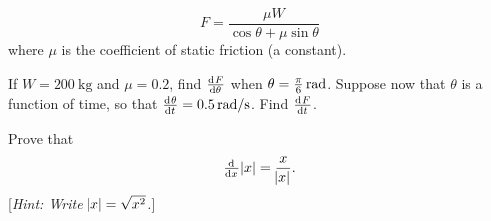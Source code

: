 \begin{questions}
\begin{displaymath}
              F = \frac{\mu W}{\cos \theta + \mu \sin \theta}
            \end{displaymath}
            where $ \mu $ is the coefficient of static friction (a constant).
    \begin{parts}
      \parA If $ W = \SI{200}{\kilo\gram} $ and $ \mu = 0.2 $, find $ \od{F}{\theta} $ when $ \theta = \frac{\pi}{6}\thinspace\si{\radian} $.
      \parM Suppose now that $ \theta $ is a function of time, so that $ \od{\theta}{t} = \SI{0.5}{\radian / \second} $. Find $ \od{F}{t} $.
    \end{parts}
  \questioE Prove that
            \begin{displaymath}
              \od{}{x} \abs{x} = \frac{x}{\abs{x}}.
            \end{displaymath}
            [\textit{Hint: Write $ \abs{x} = \sqrt{x^2} $.}]
\end{questions}


